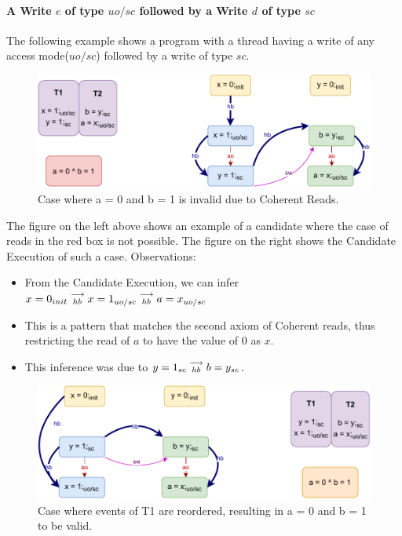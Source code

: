
    \paragraph{A Write $e$ of type $uo/sc$ followed by a Write $d$ of type $sc$}
        
        The following example shows a program with a thread having a write of any access mode($uo/sc$) followed by a write of type $sc$.
        \begin{figure}[H]
            \centering
            \includegraphics[scale=0.7]{InstructionReordering/Example7(Wuo,sc-Wsc).pdf}
            \caption{Case where a = 0 and b = 1 is invalid due to Coherent Reads.}
        \end{figure}
        The figure on the left above shows an example of a candidate where the case of reads in the red box is not possible. 
        The figure on the right shows the Candidate Execution of such a case. 
        Observations:
        \begin{itemize}
            \item From the Candidate Execution, we can infer $x=0_{init}\stackrel{\longrightarrow}{_{hb}}x=1_{uo/sc}\stackrel{\longrightarrow}{_{hb}}a=x_{uo/sc}$
            \item This is a pattern that matches the second axiom of Coherent reads, thus restricting the read of $a$ to have the value of $0$ as $x$. 
            \item This inference was due to $y=1_{sc}\stackrel{\longrightarrow}{_{hb}}b=y_{sc}$.
        \end{itemize}

        \begin{figure}[H]
            \centering
            \includegraphics[scale=0.7]{InstructionReordering/Example7R(Wuo,sc-Wsc).pdf}
            \caption{Case where events of T1 are reordered, resulting in  a = 0 and b = 1 to be valid.}
        \end{figure}
        
